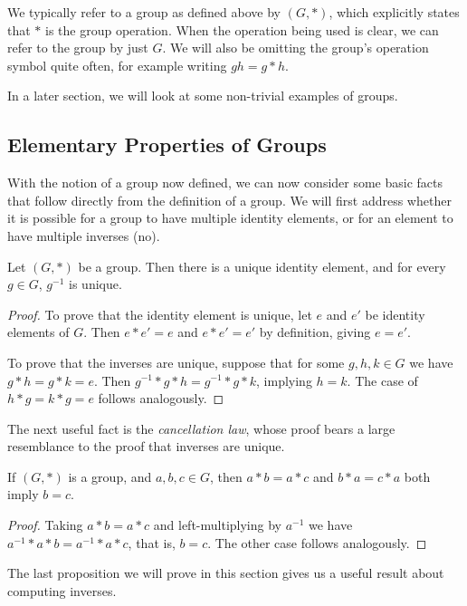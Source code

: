 \documentclass[a4]{scrreprt}
\newcommand{\newsubsection}{\subsection}
\begin{document}
We typically refer to a group as defined above by $(G, *)$, which explicitly states that $*$ is the group operation. When the operation being used is clear, we can refer to the group by just $G$. We will also be omitting the group's operation symbol quite often, for example writing $gh = g * h$. 

 In a later section, we will look at some non-trivial examples of groups.

\newsubsection{Elementary Properties of Groups}

With the notion of a group now defined, we can now consider some basic facts that follow directly from the definition of a group. We will first address whether it is possible for a group to have multiple identity elements, or for an element to have multiple inverses (no).

\begin{proposition}
	Let $(G, *)$ be a group. Then there is a unique identity element, and for every $g \in G$, $g^{-1}$ is unique.
\end{proposition}
\begin{proof}
	To prove that the identity element is unique, let $e$ and $e'$ be identity elements of $G$. Then $e* e' = e$ and $e* e' = e'$ by definition, giving $e = e'$. 
	
	To prove that the inverses are unique, suppose that for some $g, h, k \in G$ we have $g* h = g *k = e$. Then $g^{-1}* g *h = g^{-1} *g * k$, implying $h = k$. The case of $h * g = k * g = e$ follows analogously.
\end{proof}

The next useful fact is the \emph{cancellation law}, whose proof bears a large resemblance to the proof that inverses are unique.

\begin{proposition}
	If $(G, *)$ is a group, and $a, b, c \in G$, then $a*b = a*c$ and $b*a = c*a$ both imply $b = c$.
\end{proposition}
\begin{proof}
	Taking $a * b = a * c$ and left-multiplying by $a^{-1}$ we have $a^{-1} * a * b = a^{-1} * a * c$, that is, $b = c$. The other case follows analogously.
\end{proof}

The last proposition we will prove in this section gives us a useful result about computing inverses.
\end{document}
